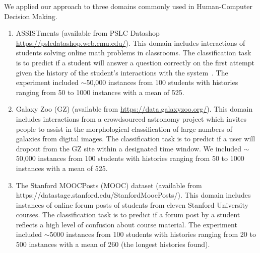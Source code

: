 \documentclass[letterpaper]{article} %
\theoremstyle{definition}
\newcommand{\kibitz}[2]{\ifnum\Comments=1{\color{#1}{#2}}\fi}
\newcommand{\ym}[1]{\kibitz{blue}{[YM:#1]}}
\newcommand{\li}[1]{\kibitz{brown}{[LL:#1]}}
\begin{document}
We applied our approach to three domains  commonly  used  in 
Human-Computer Decision Making. \li{Why capitalize Human-Computer Decision-Making?} 

\begin{enumerate}
    \item   ASSISTments (available from PSLC Datashop \url{https://pslcdatashop.web.cmu.edu/}). This domain  
    includes interactions of students  solving online math problems in classrooms. The classification task is to predict if a student will answer a question  correctly on the first attempt given the history of the student's interactions with the system~\cite{feng2006addressing}. 
    The experiment included $\sim$50,000 instances from 100 students with histories ranging from 50 to 1000 instances with a mean of 525.
    
    \item   Galaxy Zoo  (GZ)    (available from \url{https://data.galaxyzoo.org/}). This domain includes interactions from a crowdsourced astronomy project which invites people to assist in the morphological classification of large numbers of galaxies from digital images.  The classification task is to predict if a user
    will dropout from the GZ site within a designated time window. We included $\sim$50,000 instances from 100 students with histories ranging from 50 to 1000 instances with a mean of 525. 
    
    
    \item The Stanford MOOCPosts (MOOC) dataset (available from https://datastage.stanford.edu/StanfordMoocPosts/). This domain  includes instances of   online forum posts of students from eleven Stanford University   courses. The  classification task is to predict if a forum post by a student reflects a high level of confusion about course material. The experiment included $\sim$5000 instances from 100 students with histories ranging from 20 to 500 instances with a mean of 260 (the longest histories found).
    
\end{enumerate} 
\end{document}
